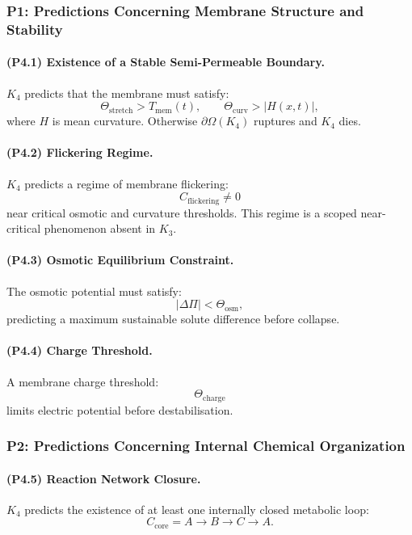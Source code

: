 \subsubsection{P1: Predictions Concerning Membrane Structure and Stability}

\paragraph{(P4.1) Existence of a Stable Semi-Permeable Boundary.}
$K_4$ predicts that the membrane must satisfy:
\[
\Theta_{\mathrm{stretch}} > T_{\mathrm{mem}}(t), \qquad
\Theta_{\mathrm{curv}} > |H(x,t)|,
\]
where $H$ is mean curvature.
Otherwise $\partial\Omega(K_4)$ ruptures and $K_4$ dies.

\paragraph{(P4.2) Flickering Regime.}
$K_4$ predicts a regime of membrane flickering:
\[
C_{\mathrm{flickering}} \neq 0
\]
near critical osmotic and curvature thresholds.
This regime is a scoped near-critical phenomenon absent in $K_3$.

\paragraph{(P4.3) Osmotic Equilibrium Constraint.}
The osmotic potential must satisfy:
\[
|\Delta \Pi| < \Theta_{\mathrm{osm}},
\]
predicting a maximum sustainable solute difference before collapse.

\paragraph{(P4.4) Charge Threshold.}
A membrane charge threshold:
\[
\Theta_{\mathrm{charge}}
\]
limits electric potential before destabilisation.

\subsubsection{P2: Predictions Concerning Internal Chemical Organization}

\paragraph{(P4.5) Reaction Network Closure.}
$K_4$ predicts the existence of at least one internally closed metabolic loop:
\[
C_{\mathrm{core}} = A \to B \to C \to A.
\]

